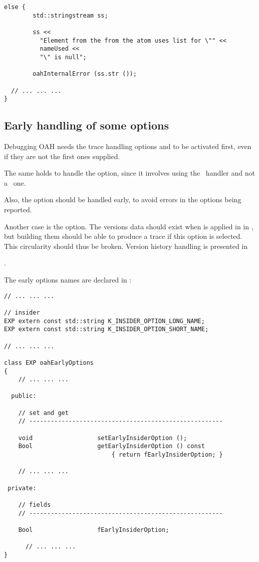 {\begin{lstlisting}[language=CPlusPlus]
      else {
        std::stringstream ss;

        ss <<
          "Element from the from the atom uses list for \"" <<
          nameUsed <<
          "\" is null";

        oahInternalError (ss.str ());

  // ... ... ...
}
\end{lstlisting}


\subsection{Early handling of some options}

Debugging OAH needs the trace handling options  and  to be activated first, even if they are not the first ones supplied.

The same holds to handle the  option, since it involves using the \insider\ handler and not a \regular\ one.

Also, the  option should be handled early, to avoid errors in the options being reported.

Another case is the  option. The versions data should exist when  is applied in  in , but building them should be able to produce a trace if this option is selected. This circularity  should thus be broken. Version history handling is presented in }.

The early options names are declared in :
\begin{lstlisting}[language=Terminal]
// ... ... ...

// insider
EXP extern const std::string K_INSIDER_OPTION_LONG_NAME;
EXP extern const std::string K_INSIDER_OPTION_SHORT_NAME;

// ... ... ...

class EXP oahEarlyOptions
{
	// ... ... ...

  public:

    // set and get
    // ------------------------------------------------------

    void                  setEarlyInsiderOption ();
    Bool                  getEarlyInsiderOption () const
                              { return fEarlyInsiderOption; }

	// ... ... ...

 private:

    // fields
    // ------------------------------------------------------

    Bool                  fEarlyInsiderOption;

	  // ... ... ...
}
\end{lstlisting}

